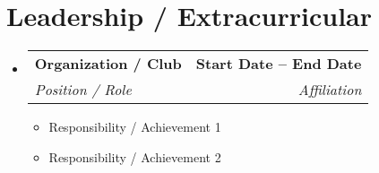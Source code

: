 \documentclass[letterpaper,11pt]{article}
\makeatletter
\newcommand{\resumeItem}[1]{\item\small{#1 \vspace{-2pt}}}
\newcommand{\resumeSubheading}[4]{
  \vspace{-2pt}\item
  \begin{tabular*}{1.0\textwidth}[t]{l@{\extracolsep{\fill}}r}
    \textbf{#1} & \textbf{\small #2} \\
    \textit{\small#3} & \textit{\small #4} \\
  \end{tabular*}\vspace{-7pt}
}
\newcommand{\resumeItemListStart}{\begin{itemize}}
\newcommand{\resumeItemListEnd}{\end{itemize}\vspace{-5pt}}
\newcommand{\resumeSubHeadingListStart}{\begin{itemize}[leftmargin=0.0in, label={}]}
\newcommand{\resumeSubHeadingListEnd}{\end{itemize}}
\makeatother
\begin{document}
\section{Leadership / Extracurricular}
\resumeSubHeadingListStart
  \resumeSubheading
    {Organization / Club}{Start Date -- End Date}
    {Position / Role}{Affiliation}
    \resumeItemListStart
        \resumeItem{Responsibility / Achievement 1}
        \resumeItem{Responsibility / Achievement 2}
    \resumeItemListEnd
\resumeSubHeadingListEnd
\end{document}
